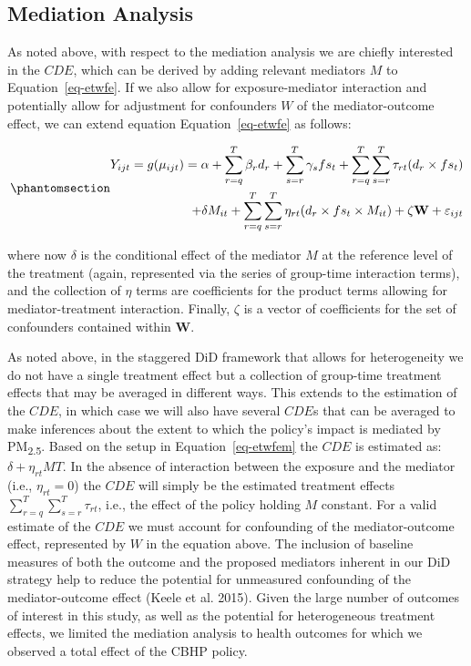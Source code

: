 \documentclass[
  letterpaper,
  DIV=11,
  numbers=noendperiod]{scrartcl}
\begin{document}
\subsection{Mediation Analysis}\label{mediation-analysis}

As noted above, with respect to the mediation analysis we are chiefly
interested in the \(CDE\), which can be derived by adding relevant
mediators \(M\) to Equation~\ref{eq-etwfe}. If we also allow for
exposure-mediator interaction and potentially allow for adjustment for
confounders \(W\) of the mediator-outcome effect, we can extend equation
Equation~\ref{eq-etwfe} as follows:

\begin{equation}\phantomsection\label{eq-etwfem}{
\begin{aligned}
Y_{ijt}=g(\mu_{ijt}) = \alpha + \sum_{r=q}^{T} \beta_{r} d_{r} + \sum_{s=r}^{T} \gamma_{s} fs_{t}+ \sum_{r=q}^{T} \sum_{s=r}^{T} \tau_{rt} (d_{r} \times fs_{t}) \\ + \delta M_{it} + \sum_{r=q}^{T} \sum_{s=r}^{T} \eta_{rt} (d_{r} \times fs_{t} \times M_{it}) + \zeta \mathbf{W} + \varepsilon_{ijt}
\end{aligned}
}\end{equation}

where now \(\delta\) is the conditional effect of the mediator \(M\) at
the reference level of the treatment (again, represented via the series
of group-time interaction terms), and the collection of \(\eta\) terms
are coefficients for the product terms allowing for mediator-treatment
interaction. Finally, \(\zeta\) is a vector of coefficients for the set
of confounders contained within \(\mathbf{W}\).

As noted above, in the staggered DiD framework that allows for
heterogeneity we do not have a single treatment effect but a collection
of group-time treatment effects that may be averaged in different ways.
This extends to the estimation of the \(CDE\), in which case we will
also have several \(CDE\)s that can be averaged to make inferences about
the extent to which the policy's impact is mediated by
PM\textsubscript{2.5}. Based on the setup in Equation~\ref{eq-etwfem}
the \(CDE\) is estimated as: \(\delta + \eta_{rt}MT\). In the absence of
interaction between the exposure and the mediator (i.e.,
\(\eta_{rt}=0\)) the \(CDE\) will simply be the estimated treatment
effects \(\sum_{r=q}^{T} \sum_{s=r}^{T} \tau_{rt}\), i.e., the effect of
the policy holding \(M\) constant. For a valid estimate of the \(CDE\)
we must account for confounding of the mediator-outcome effect,
represented by \(W\) in the equation above. The inclusion of baseline
measures of both the outcome and the proposed mediators inherent in our
DiD strategy help to reduce the potential for unmeasured confounding of
the mediator-outcome effect (Keele et al. 2015). Given the large number
of outcomes of interest in this study, as well as the potential for
heterogeneous treatment effects, we limited the mediation analysis to
health outcomes for which we observed a total effect of the CBHP policy.
\end{document}
